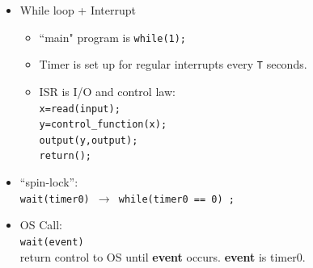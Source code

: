 \begin{itemize}
        \item While loop + Interrupt
        \begin{itemize}
                \item ``main" program is {\tt while(1);}
                \item Timer is set up for regular interrupts
                every {\tt T} seconds.
                \item ISR is I/O and control law: \\
                {\tt x=read(input); \\
                y=control\_function(x);  \\
                output(y,output); \\
                return();}
        \end{itemize}


        \item  ``spin-lock'': \\
         {\tt wait(timer0) $\to$ while(timer0 == 0) ;}
        \item  OS Call:   \\
        {\tt wait(event)} \\
        return control to OS until {\bf event} occurs.  {\bf event} is timer0.
\end{itemize}





%
